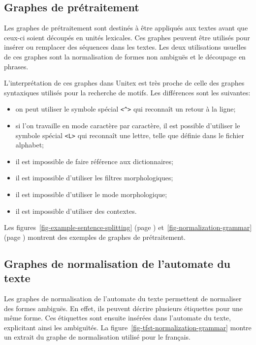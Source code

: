 \subsection{Graphes de prétraitement}
Les graphes de prétraitement sont destinés à être appliqués aux textes avant que ceux-ci soient
découpés en unités lexicales. Ces graphes peuvent être utilisés pour insérer ou
remplacer des séquences dans les textes. Les deux utilisations usuelles de ces graphes sont
la normalisation de formes non ambiguës et le découpage en phrases.


\bigskip
\noindent L’interprétation de ces graphes dans Unitex est très proche de celle des graphes
syntaxiques utilisés pour la recherche de motifs. Les différences sont les suivantes:

\begin{itemize}
  \item on peut utiliser le symbole spécial \verb+<^>+ qui reconnaît un retour à la
  	  ligne;\index{\verbc{<^>}}
  \item si l'on travaille en mode caractère par caractère, il est possible d'utiliser 
  	  le symbole spécial \verb+<L>+ qui reconnaît une lettre, telle que définie dans le fichier
  	  alphabet;
  \item il est impossible de faire référence aux dictionnaires;
  \item il est impossible d’utiliser les filtres morphologiques;
  \item il est impossible d’utiliser le mode morphologique;
  \item il est impossible d’utiliser des contextes.
\end{itemize}

Les figures~\ref{fig-example-sentence-splitting} (page \pageref{fig-example-sentence-splitting})
et~\ref{fig-normalization-grammar} (page \pageref{fig-normalization-grammar}) montrent des exemples
de graphes de prétraitement.


\subsection{Graphes de normalisation de l’automate du texte}
\label{section-normalizing-text-automataon}
Les graphes de normalisation de l’automate du texte permettent de normaliser des formes
ambiguës. En effet, ils peuvent décrire plusieurs étiquettes pour une même forme. Ces étiquettes
sont ensuite insérées dans l’automate du texte, explicitant ainsi les ambiguïtés. La
figure~\ref{fig-tfst-normalization-grammar} montre un extrait du graphe de normalisation utilisé
pour le français.

